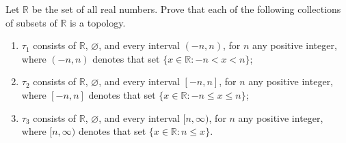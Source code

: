 \begin{exercise}
    Let $\mathbb{R}$ be the set of all real numbers. Prove that each of the following collections of subsets of $\mathbb{R}$ is a topology.
    \begin{enumerate}[label={(\roman*)}]
        \item $\tau_{1}$ consists of $\mathbb{R}$, $\varnothing$, and every interval $(-n, n)$, for $n$ any positive integer, where $(-n, n)$ denotes that set $\{ x\in\mathbb{R} : -n < x < n \}$;
        \item $\tau_{2}$ consists of $\mathbb{R}$, $\varnothing$, and every interval $[-n, n]$, for $n$ any positive integer, where $[-n, n]$ denotes that set $\{ x\in\mathbb{R} : -n \leq x \leq n \}$;
        \item $\tau_{3}$ consists of $\mathbb{R}$, $\varnothing$, and every interval $[n, \infty)$, for $n$ any positive integer, where $[n, \infty)$ denotes that set $\{ x\in\mathbb{R} : n\leq x \}$.
    \end{enumerate}
\end{exercise}

